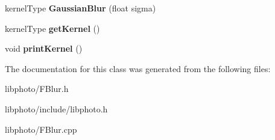 \begin{DoxyCompactItemize}
\item 
\hypertarget{classFBlur_ad88afc728cb9b8c84443a0bf4a30983f}{kernel\-Type {\bfseries Gaussian\-Blur} (float sigma)}\label{classFBlur_ad88afc728cb9b8c84443a0bf4a30983f}

\item 
\hypertarget{classFBlur_a7cb16fe19cd319be83d95de5686e8d39}{kernel\-Type {\bfseries get\-Kernel} ()}\label{classFBlur_a7cb16fe19cd319be83d95de5686e8d39}

\item 
\hypertarget{classFBlur_a5f500e9bad040039fb43e58be03d57e6}{void {\bfseries print\-Kernel} ()}\label{classFBlur_a5f500e9bad040039fb43e58be03d57e6}

\end{DoxyCompactItemize}


The documentation for this class was generated from the following files\-:\begin{DoxyCompactItemize}
\item 
libphoto/F\-Blur.\-h\item 
libphoto/include/libphoto.\-h\item 
libphoto/F\-Blur.\-cpp\end{DoxyCompactItemize}
